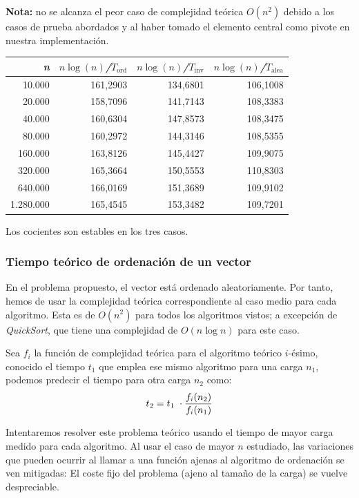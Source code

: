 \documentclass[12pt,a4paper]{article}
\renewcommand{\thesubsubsection}{\arabic{subsubsection}.}
\newcommand{\result}[1]{%
  \subsubsection{#1}%
  \label{result:\thesubsubsection}
}
\begin{document}
\vspace{2mm}
\textbf{Nota:} no se alcanza el peor caso de complejidad teórica $O(n^2)$ debido a los casos de prueba abordados y al haber tomado el elemento central como pivote en nuestra implementación.
\begin{table}[H]
\centering
\renewcommand{\arraystretch}{1.2}
\begin{tabular}{|r|r|r|r|}
\hline
\rowcolor{LightSteelBlue2}
\textit{n} & \textit{$n \log(n)$/$T_\text{ord}$}  & \textit{$n \log(n)$/$T_\text{inv}$} & \textit{$n \log(n)$/$T_\text{alea}$} \\\hline
10.000 & 161,2903 & 134,6801  & 106,1008 \\\hline
20.000 & 158,7096 & 141,7143 & 108,3383 \\\hline
40.000 & 160,6304 & 147,8573 &108,3475 \\\hline 
80.000 & 160,2972  & 144,3146 &108,5355 \\\hline 
160.000 & 163,8126  & 145,4427  & 109,9075 \\\hline
320.000 & 165,3664 & 150,5553 & 110,8303 \\\hline
640.000 & 166,0169 & 151,3689 &109,9102 \\\hline
1.280.000 &165,4545 & 153,3482 &109,7201  \\\hline
\end{tabular}  
\end{table}
Los cocientes son estables en los tres casos.

\vspace{6mm}  
\result{Tiempo teórico de ordenación de un vector}
\hspace{3mm}
En el problema propuesto, el vector está ordenado aleatoriamente. Por tanto, hemos de usar la complejidad teórica correspondiente al caso medio para cada algoritmo. Esta es de $O(n^2)$ para todos los algoritmos vistos; a excepción de \textit{QuickSort}, que tiene una complejidad de $O(n \log n)$ para este caso.

\vspace{4mm}
Sea $f_i$ la función de complejidad teórica para el algoritmo teórico $i$-ésimo, conocido el tiempo $t_1$ que emplea ese mismo algoritmo para una carga $n_1$, podemos predecir el tiempo para otra carga $n_2$ como:
$$ t_2 = t_1 \hspace{1mm} \cdot \frac{f_i(n_2)}{f_i(n_1)}$$

Intentaremos resolver este problema teórico usando el tiempo de mayor carga medido para cada algoritmo. Al usar el caso de mayor $n$ estudiado, las variaciones que pueden ocurrir al llamar a una función ajenas al algoritmo de ordenación se ven mitigadas: El coste fijo del problema (ajeno al tamaño de la carga) se vuelve despreciable.
\end{document}
